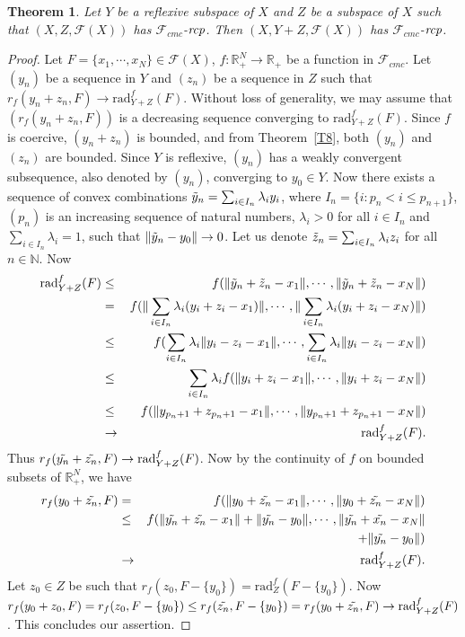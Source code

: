 \documentclass[11pt]{amsart}
\newtheorem{thm}{Theorem}[section]
\newcommand{\ra}{\rightarrow}
\newcommand{\la}{\lambda}
\newcommand{\Ti}{\Tilde}
\newcommand{\mb}{\mathbb}
\newcommand{\mc}{\mathcal}
\newcommand{\tr}{\textrm}
\newcommand{\mr}{\mathscr}
\newcommand{\trr}{\textrm{rad}}
\newcommand{\ercp}{\bf{\emph{rcp}}}
\newcommand{\beqa}{\begin{eqnarray*}}
\newcommand{\eeqa}{\end{eqnarray*}}
\begin{document}
\begin{thm}\label{T6}
Let $Y$ be a reflexive subspace of $X$ and $Z$ be a subspace of $X$ such that $(X,Z,\mc{F}(X))$ has $\mr{F}_{cmc}$-$\ercp$. Then $(X,Y+Z,\mc{F}(X))$ has $\mr{F}_{cmc}$-$\ercp$.
\end{thm}
\begin{proof}
Let $F=\{x_1,\cdots,x_N\}\in\mc{F}(X)$, $f:\mb{R}^N_+\ra\mb{R}_+$ be a function in $\mr{F}_{cmc}$. Let $(y_n)$ be a sequence in $Y$ and $(z_n)$ be a sequence in $Z$ such that $r_f(y_n+z_n,F)\ra\tr{rad}_{Y+Z}^f(F)$. Without loss of generality, we may assume that $(r_f(y_n+z_n,F))$ is a decreasing sequence converging to $\trr_{Y+Z}^f(F)$. Since $f$ is coercive, $(y_n+z_n)$ is bounded, and from Theorem~\ref{T8}, both $(y_n)$ and $(z_n)$ are bounded. Since $Y$ is reflexive, $(y_n)$ has a weakly convergent subsequence, also denoted by $(y_n)$, converging to $y_0\in Y$. Now there exists a sequence of convex combinations $\Ti{y}_n=\sum_{i\in I_n}\la_iy_i$, where $I_n=\{i:p_n<i\leq p_{n+1}\}$, $(p_n)$ is an increasing sequence of natural numbers, $\la_i>0$ for all $i\in I_n$ and $\sum_{i\in I_n}\la_i=1$, such that $\|\Ti{y}_n-y_0\|\ra0$. Let us denote $\Ti{z}_n=\sum_{i\in I_n}\la_iz_i$ for all $n\in\mb{N}$. Now 
\beqa
\trr_{Y+Z}^f(F)&\leq& f(\|\Ti{y}_n+\Ti{z}_n-x_1\|,\cdots,\|\Ti{y}_n+\Ti{z}_n-x_N\|)\\
&=&f(\|\sum_{i\in I_n}\la_i(y_i+z_i-x_1)\|,\cdots,\|\sum_{i\in I_n}\la_i(y_i+z_i-x_N)\|)\\
&\leq& f(\sum_{i\in I_n}\la_i\|y_i-z_i-x_1\|,\cdots,\sum_{i\in I_n}\la_i\|y_i-z_i-x_N\|)\\
&\leq&\sum_{i\in I_n}\la_if(\|y_i+z_i-x_1\|,\cdots,\|y_i+z_i-x_N\|)\\
&\leq& f(\|y_{p_n+1}+z_{p_n+1}-x_1\|,\cdots,\|y_{p_n+1}+z_{p_n+1}-x_N\|)\\
&\ra&\trr_{Y+Z}^f(F).
\eeqa
Thus $r_f(\Ti{y_n}+\Ti{z_n},F)\ra\trr_{Y+Z}^f(F)$. Now by the continuity of $f$ on bounded subsets of $\mb{R}^N_+$, we have 
\beqa
r_f(y_0+\Ti{z_n},F)&=&f(\|y_0+\Ti{z_n}-x_1\|,\cdots,\|y_0+\Ti{z_n}-x_N\|)\\
&\leq& f(\|\Ti{y_n}+\Ti{z_n}-x_1\|+\|\Ti{y_n}-y_0\|,\cdots,\|\Ti{y_n}+\Ti{x_n}-x_N\|\\
&&+\|\Ti{y_n}-y_0\|)\\
&\ra&\trr_{Y+Z}^f(F).
\eeqa 
Let $z_0\in Z$ be such that $r_f(z_0,F-\{y_0\})=\trr_Z^f(F-\{y_0\})$. Now $r_f(y_0+z_0,F)=r_f(z_0,F-\{y_0\})\leq r_f(\Ti{z_n},F-\{y_0\})= r_f(y_0+\Ti{z_n},F)\ra\trr_{Y+Z}^f(F)$. This concludes our assertion.
\end{proof}
\end{document}
